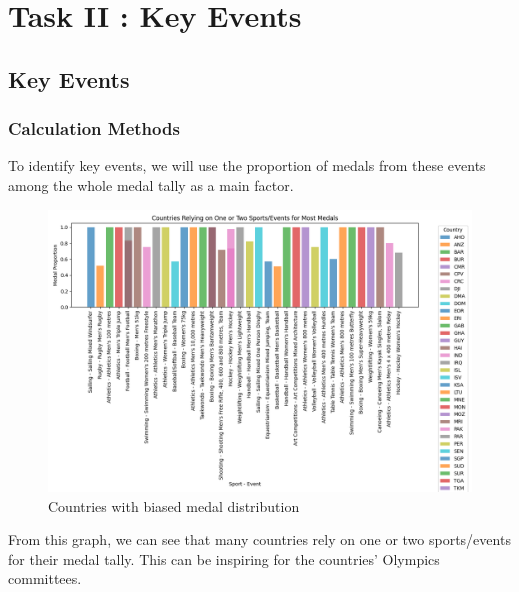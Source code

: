 \section{Task II : Key Events}
\subsection{Key Events}
\subsubsection*{Calculation Methods}
To identify key events, we will use the proportion of medals from these events among the whole medal tally as a main factor.

\begin{figure}[htbp]
    \centering
    \includegraphics[width=1.1\textwidth]{./figures/Key_event.png}
    \caption{ Countries with biased medal distribution}
    \label{fig:Key_event}
\end{figure}

From this graph, we can see that many countries rely on one or two sports/events for their medal tally. This can be inspiring for the countries' Olympics committees.
